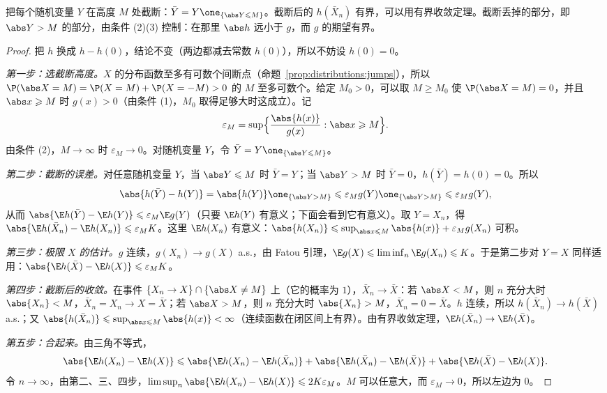 \begin{remark}[证明思路]
把每个随机变量 $Y$ 在高度 $M$ 处截断：$\bar Y=Y\one_{\{\abs Y\leqslant M\}}$。截断后的 $h(\bar X_n)$ 有界，可以用有界收敛定理。截断丢掉的部分，即 $\abs Y>M$ 的部分，由条件 (2)(3) 控制：在那里 $\abs h$ 远小于 $g$，而 $g$ 的期望有界。
\end{remark}

\begin{proof}
把 $h$ 换成 $h-h(0)$，结论不变（两边都减去常数 $h(0)$），所以不妨设 $h(0)=0$。

\emph{第一步：选截断高度。}$X$ 的分布函数至多有可数个间断点（命题~\ref{prop:distributions:jumps}），所以 $\P(\abs X=M)=\P(X=M)+\P(X=-M)>0$ 的 $M$ 至多可数个。给定 $M_0>0$，可以取 $M\geqslant M_0$ 使 $\P(\abs X=M)=0$，并且 $\abs x\geqslant M$ 时 $g(x)>0$（由条件 (1)，$M_0$ 取得足够大时这成立）。记
\[
\varepsilon_M=\sup\Bigl\{\frac{\abs{h(x)}}{g(x)}:\abs x\geqslant M\Bigr\}.
\]
由条件 (2)，$M\to\infty$ 时 $\varepsilon_M\to0$。对随机变量 $Y$，令 $\bar Y=Y\one_{\{\abs Y\leqslant M\}}$。

\emph{第二步：截断的误差。}对任意随机变量 $Y$，当 $\abs Y\leqslant M$ 时 $\bar Y=Y$；当 $\abs Y>M$ 时 $\bar Y=0$，$h(\bar Y)=h(0)=0$。所以
\[
\abs{h(\bar Y)-h(Y)}=\abs{h(Y)}\one_{\{\abs Y>M\}}\leqslant\varepsilon_Mg(Y)\one_{\{\abs Y>M\}}\leqslant\varepsilon_Mg(Y),
\]
从而 $\abs{\E h(\bar Y)-\E h(Y)}\leqslant\varepsilon_M\E g(Y)$（只要 $\E h(Y)$ 有意义；下面会看到它有意义）。取 $Y=X_n$，得 $\abs{\E h(\bar X_n)-\E h(X_n)}\leqslant\varepsilon_MK$。这里 $\E h(X_n)$ 有意义：$\abs{h(X_n)}\leqslant\sup_{\abs x\leqslant M}\abs{h(x)}+\varepsilon_Mg(X_n)$ 可积。

\emph{第三步：极限 $X$ 的估计。}$g$ 连续，$g(X_n)\to g(X)$ a.s.，由 Fatou 引理，$\E g(X)\leqslant\liminf_n\E g(X_n)\leqslant K$。于是第二步对 $Y=X$ 同样适用：$\abs{\E h(\bar X)-\E h(X)}\leqslant\varepsilon_MK$。

\emph{第四步：截断后的收敛。}在事件 $\{X_n\to X\}\cap\{\abs X\neq M\}$ 上（它的概率为 $1$），$\bar X_n\to\bar X$：若 $\abs X<M$，则 $n$ 充分大时 $\abs{X_n}<M$，$\bar X_n=X_n\to X=\bar X$；若 $\abs X>M$，则 $n$ 充分大时 $\abs{X_n}>M$，$\bar X_n=0=\bar X$。$h$ 连续，所以 $h(\bar X_n)\to h(\bar X)$ a.s.；又 $\abs{h(\bar X_n)}\leqslant\sup_{\abs x\leqslant M}\abs{h(x)}<\infty$（连续函数在闭区间上有界）。由有界收敛定理，$\E h(\bar X_n)\to \E h(\bar X)$。

\emph{第五步：合起来。}由三角不等式，
\[
\abs{\E h(X_n)-\E h(X)}\leqslant\abs{\E h(X_n)-\E h(\bar X_n)}+\abs{\E h(\bar X_n)-\E h(\bar X)}+\abs{\E h(\bar X)-\E h(X)} .
\]
令 $n\to\infty$，由第二、三、四步，$\limsup_n\abs{\E h(X_n)-\E h(X)}\leqslant2K\varepsilon_M$。$M$ 可以任意大，而 $\varepsilon_M\to0$，所以左边为 $0$。
\end{proof}

